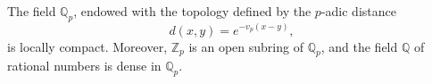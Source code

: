 The field $\mathbb{Q}_p$, endowed with the topology defined by the $p$-adic distance
$$d(x, y) = e^{-v_p(x-y)},$$
is locally compact. Moreover, $\mathbb{Z}_p$ is an open subring of $\mathbb{Q}_p$, and the field $\mathbb{Q}$ of rational numbers is dense in $\mathbb{Q}_p$.

